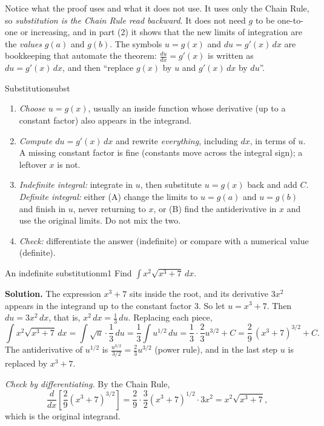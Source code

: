 \documentclass[11pt]{article}
\begin{document}
Notice what the proof uses and what it does not use. It uses only the Chain Rule, so \emph{substitution is the Chain Rule read backward}. It does not need $g$ to be one-to-one or increasing, and in part (2) it shows that the new limits of integration are the \emph{values} $g(a)$ and $g(b)$. The symbols $u=g(x)$ and $du=g'(x)\,dx$ are bookkeeping that automate the theorem: $\frac{du}{dx}=g'(x)$ is written as $du=g'(x)\,dx$, and then ``replace $g(x)$ by $u$ and $g'(x)\,dx$ by $du$''.

\begin{proc}{Substitution}{subst}
\begin{enumerate}[nosep]
  \item \emph{Choose $u=g(x)$}, usually an inside function whose derivative (up to a constant factor) also appears in the integrand.
  \item \emph{Compute $du=g'(x)\,dx$} and rewrite \emph{everything}, including $dx$, in terms of $u$. A missing constant factor is fine (constants move across the integral sign); a leftover $x$ is not.
  \item \emph{Indefinite integral:} integrate in $u$, then substitute $u=g(x)$ back and add $C$.\\ \emph{Definite integral:} either (A) change the limits to $u=g(a)$ and $u=g(b)$ and finish in $u$, never returning to $x$, or (B) find the antiderivative in $x$ and use the original limits. Do not mix the two.
  \item \emph{Check:} differentiate the answer (indefinite) or compare with a numerical value (definite).
\end{enumerate}
\end{proc}

\begin{exmp}{An indefinite substitution}{m1}
Find $\int x^2\sqrt{x^3+7}\,dx$.

\textbf{Solution.} The expression $x^3+7$ sits inside the root, and its derivative $3x^2$ appears in the integrand up to the constant factor $3$. So let $u=x^3+7$. Then $du=3x^2\,dx$, that is, $x^2\,dx=\frac13\,du$. Replacing each piece,
\[\int x^2\sqrt{x^3+7}\,dx=\int\sqrt u\cdot\frac13\,du=\frac13\int u^{1/2}\,du=\frac13\cdot\frac23u^{3/2}+C=\frac29\,(x^3+7)^{3/2}+C .\]
The antiderivative of $u^{1/2}$ is $\frac{u^{3/2}}{3/2}=\frac23u^{3/2}$ (power rule), and in the last step $u$ is replaced by $x^3+7$.

\emph{Check by differentiating.} By the Chain Rule,
\[\frac{d}{dx}\left[\frac29(x^3+7)^{3/2}\right]=\frac29\cdot\frac32(x^3+7)^{1/2}\cdot3x^2=x^2\sqrt{x^3+7},\]
which is the original integrand.
\end{exmp}
\end{document}
